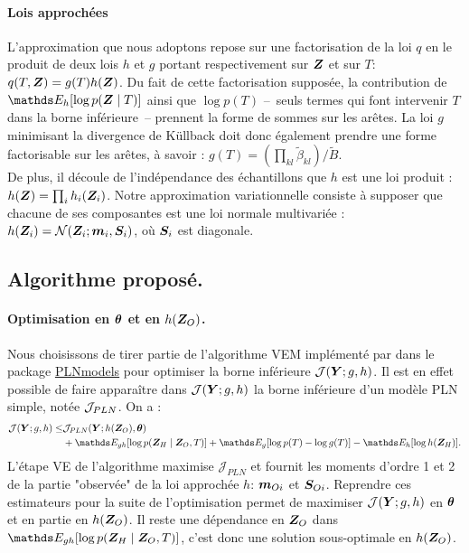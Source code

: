 \paragraph{Lois approchées}
L'approximation que nous adoptons repose sur une factorisation de la loi $q$ en le produit de deux lois $h$ et $g$ portant respectivement sur $\boldsymbol{Z}$ et sur $T$: $ q(T,\boldsymbol{Z}) = g(T)h(\boldsymbol{Z})$. Du fait de cette factorisation supposée, la contribution de  $\Esp_h[\log p(\Zbf\mid T)]$ ainsi que $\log p(T)$ --~seuls termes qui font intervenir $T$ dans la borne inférieure~-- prennent la forme de sommes sur les arêtes. La loi $g$ minimisant la divergence de Küllback doit donc également prendre une forme factorisable sur les arêtes, à savoir :
$ g(T) = \left(\prod_{kl} \widetilde{\beta}_{kl} \right) / \widetilde{B}$. \\
 
De plus, il découle de l'indépendance des échantillons que $h$ est une loi produit : $ h(\boldsymbol{Z}) = \prod_i h_i(\boldsymbol{Z}_i)$.
Notre approximation variationnelle consiste à supposer que chacune de ses composantes est une loi normale multivariée : $h(\boldsymbol{Z}_i) = \mathcal{N}(\boldsymbol{Z}_i; \boldsymbol{m}_i, \boldsymbol{S}_i)$, où $\boldsymbol{S}_i$ est diagonale.


\subsection{Algorithme proposé.}

\paragraph{Optimisation en $\boldsymbol{\theta}$ et en $h(\boldsymbol{Z}_O)$.}
Nous choisissons de tirer partie de l'algorithme VEM implémenté par \citet{CMR18,PLNnetwork} dans le package \url{PLNmodels} pour optimiser la borne inférieure $\mathcal{J}(\boldsymbol{Y}; g,h)$. Il est en effet possible de faire apparaître dans $\mathcal{J}(\boldsymbol{Y}; g,h)$ la borne inférieure d'un modèle PLN simple, notée $\mathcal{J}_{PLN}$. On a :
\begin{align*}
\mathcal{J}(\Ybf; g,h) \leq & \mathcal{J}_{PLN}(\Ybf; h(\Zbf_O), \thetabf) \\
& + \Esp_{gh}[\log p(\Zbf_H \mid \Zbf_O,T) ]+\Esp_g[\log p(T)-\log g(T)]-\Esp_h[\log h(\Zbf_H)].
\end{align*}
L'étape VE de l'algorithme maximise $\mathcal{J}_{PLN}$ et fournit les moments d'ordre 1 et 2 de la partie "observée" de la loi approchée $h$: $\boldsymbol{m}_{Oi}$ et $\boldsymbol{S}_{Oi}$. Reprendre ces estimateurs pour la suite de l'optimisation permet de maximiser $\mathcal{J}(\boldsymbol{Y};g,h)$ en $\boldsymbol{\theta}$ et en partie en $h(\boldsymbol{Z}_O)$. Il reste une dépendance en $\boldsymbol{Z}_O$ dans $\Esp_{gh}[\log p(\Zbf_H \mid \Zbf_O,T) ]$, c'est donc une solution sous-optimale en $h(\boldsymbol{Z}_O)$.

